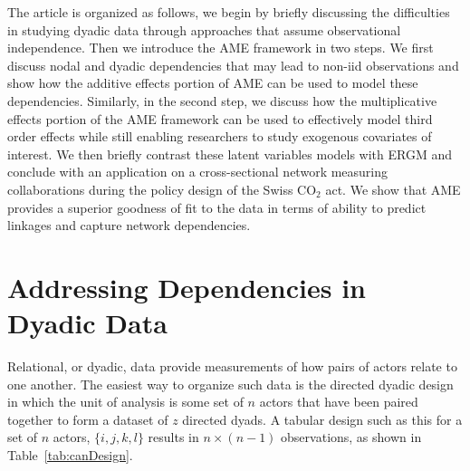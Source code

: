 \documentclass[12pt,pdflatex]{elsarticle}
\begin{document}
The article is organized as follows, we begin by briefly discussing the difficulties in studying dyadic data through approaches that assume observational independence. Then we introduce the AME framework in two steps. We first discuss nodal and dyadic dependencies that may lead to non-iid observations and show how the additive effects portion of AME can be used to model these dependencies. Similarly, in the second step, we discuss how the multiplicative effects portion of the AME framework can be used to effectively model third order effects while still enabling researchers to study exogenous covariates of interest. We then briefly contrast these latent variables models with ERGM and conclude with an application on a cross-sectional network measuring collaborations during the policy design of the Swiss CO$_{2}$ act. We show that AME provides a superior goodness of fit to the data in terms of ability to predict linkages and capture network dependencies. 
\\

\section*{\textbf{Addressing Dependencies in Dyadic Data}}

Relational, or dyadic, data provide measurements of how pairs of actors relate to one another. The easiest way to organize such data is the directed dyadic design in which the unit of analysis is some set of $n$ actors that have been paired together to form a dataset of $z$ directed dyads. A tabular design such as this for a set of $n$ actors, $\{i, j, k, l \}$ results in $n \times (n-1)$ observations, as shown in Table~\ref{tab:canDesign}. 
\end{document}
